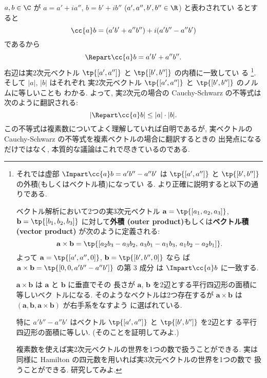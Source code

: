 \documentclass[12pt,twoside]{jarticle}
\begin{document}
$a,b\in\C$ が $a=a'+ia''$, $b=b'+ib''$ ($a',a'',b',b''\in\R$) と表わされてい
るとすると
\begin{equation*}
  \cc{a}b = (a'b' + a''b'') + i(a'b'' - a''b')
\end{equation*}
であるから
\begin{equation*}
  \Repart \cc{a}b = a'b' + a''b''.
\end{equation*}
右辺は実2次元ベクトル $\tp{[a',a'']}$ と $\tp{[b',b'']}$ の内積に一致してい
る%
\footnote{それでは虚部 $\Impart \cc{a}b = a'b'' - a''b'$ 
  は $\tp{[a',a'']}$ と $\tp{[b',b'']}$ の外積(もしくはベクトル積)になってい
  る.  より正確に説明すると以下の通りである. 

  ベクトル解析において2つの実3次元ベクトル %
  $\mathbf{a}=\tp{[a_1,a_2,a_3]}$, $\mathbf{b}=\tp{[b_1,b_2,b_3]}$
  に対して{\bf 外積 (outer product)}もしくは{\bf ベクトル積 (vector product)} 
  が次のように定義される:
  \begin{equation*}
    \mathbf{a}\times\mathbf{b} = 
    \tp{[
      a_2b_3-a_3b_2,\,
      a_3b_1-a_1b_3,\,
      a_1b_2-a_2b_1
    ]}.
  \end{equation*}
  よって $\mathbf{a}=\tp{[a',a'',0]}$, $\mathbf{b}=\tp{[b',b'',0]}$ なら
  ば $\mathbf{a}\times\mathbf{b}=\tp{[0,0,a'b''-a''b']}$ の第 $3$ 成分
  は $\Impart \cc{a}b$ に一致する.

  $\mathbf{a}\times\mathbf{b}$ は $\mathbf{a}$ と $\mathbf{b}$ に垂直でその
  長さが $\mathbf{a}$, $\mathbf{b}$ を2辺とする平行四辺形の面積に等しいベク
  トルになる.  そのようなベクトルは2つ存在するが $\mathbf{a}\times\mathbf{b}$ 
  は $(\mathbf{a},\mathbf{b},\mathbf{a}\times\mathbf{b})$ が右手系をなすよう
  に選ばれている.

  特に $a'b''-a''b'$ はベクトル $\tp{[a',a'']}$ と $\tp{[b',b'']}$ を2辺とす
  る平行四辺形の面積に等しい.  (そのことを証明してみよ.)

  複素数を使えば実2次元ベクトルの世界を1つの数で扱うことができる.
  実は同様に Hamilton の四元数を用いれば実3次元ベクトルの世界を1つの数で
  扱うことができる.  研究してみよ.
  }.  %
そして $|a|$, $|b|$ はそれぞれ
実2次元ベクトル $\tp{[a',a'']}$ と $\tp{[b',b'']}$ のノルムに等しいことも
わかる.
よって, 実2次元の場合の Cauchy-Schwarz の不等式は次のように翻訳される:
\begin{equation*}
  |\Repart \cc{a}b| \le |a|\cdot|b|.
\end{equation*}
この不等式は複素数についてよく理解していれば自明であるが,
実ベクトルの Cauchy-Schwarz の不等式を複素ベクトルの場合に翻訳するときの
出発点になるだけではなく, 本質的な議論はこれで尽きているのである.
\end{document}
